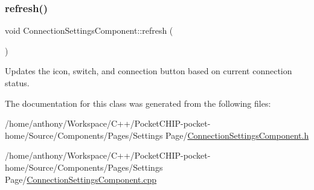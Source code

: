 \subsubsection{\texorpdfstring{refresh()}{refresh()}}
{\footnotesize\ttfamily void Connection\+Settings\+Component\+::refresh (\begin{DoxyParamCaption}{ }\end{DoxyParamCaption})\hspace{0.3cm}{\ttfamily [protected]}}

Updates the icon, switch, and connection button based on current connection status. 

The documentation for this class was generated from the following files\+:\begin{DoxyCompactItemize}
\item 
/home/anthony/\+Workspace/\+C++/\+Pocket\+C\+H\+I\+P-\/pocket-\/home/\+Source/\+Components/\+Pages/\+Settings Page/\mbox{\hyperlink{ConnectionSettingsComponent_8h}{Connection\+Settings\+Component.\+h}}\item 
/home/anthony/\+Workspace/\+C++/\+Pocket\+C\+H\+I\+P-\/pocket-\/home/\+Source/\+Components/\+Pages/\+Settings Page/\mbox{\hyperlink{ConnectionSettingsComponent_8cpp}{Connection\+Settings\+Component.\+cpp}}\end{DoxyCompactItemize}
